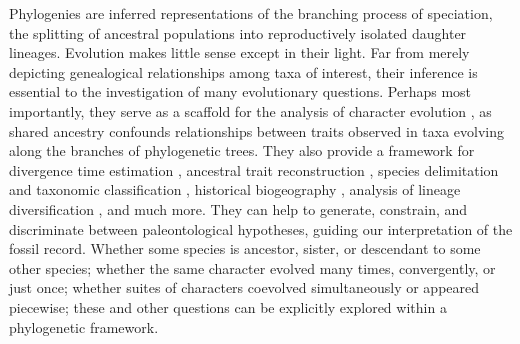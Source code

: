 \documentclass[10pt, twocolumn, twoside]{article}
\begin{document}
Phylogenies are inferred representations of the branching process of speciation, the splitting of ancestral populations into reproductively isolated daughter lineages. Evolution makes little sense except in their light. Far from merely depicting genealogical relationships among taxa of interest, their inference is essential to the investigation of many evolutionary questions. Perhaps most importantly, they serve as a scaffold for the analysis of character evolution \citep{felsensteinPhylogeniesComparativeMethod1985}, as shared ancestry confounds relationships between traits observed in taxa evolving along the branches of phylogenetic trees. They also provide a framework for divergence time estimation \citep{glazkoEstimationDivergenceTimes2003, heathBayesianInferenceSpecies2014}, ancestral trait reconstruction \citep{schluterLikelihoodAncestorStates1997, joyAncestralReconstruction2016}, species delimitation and taxonomic classification \citep{rannalaArtScienceSpecies2015}, historical biogeography \citep{donoghueIntegrativeHistoricalBiogeography2003, ronquistPhylogeneticMethodsBiogeography2011}, analysis of lineage diversification \citep{neeReconstructedEvolutionaryProcess1994, morlonPhylogeneticApproachesStudying2014}, and much more. They can help to generate, constrain, and discriminate between paleontological hypotheses, guiding our interpretation of the fossil record. Whether some species is ancestor, sister, or descendant to some other species; whether the same character evolved many times, convergently, or just once; whether suites of characters coevolved simultaneously or appeared piecewise; these and other questions can be explicitly explored within a phylogenetic framework. 
\end{document}
